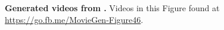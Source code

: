
\begin{center}
    \centering
    \captionsetup{type=figure}
    
    \vspace{-3mm}
    \caption{\textbf{Generated videos from \OursVideo.} 
    Videos in this Figure found at \url{https://go.fb.me/MovieGen-Figure46}.}
    \label{fig:t2v_qual_ours_figure_app2}
\end{center}%
